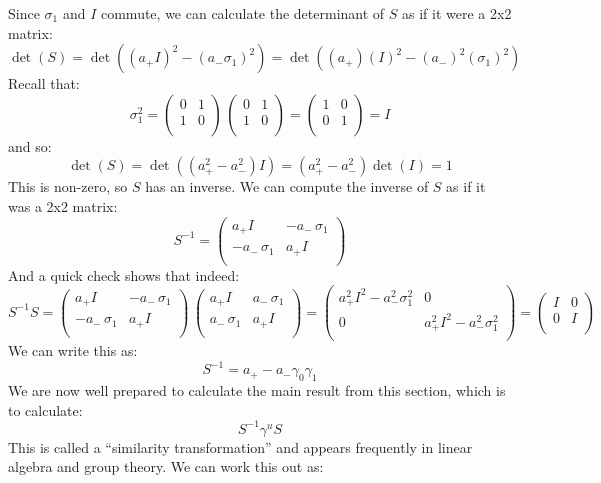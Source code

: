 \documentclass[12pt]{book}
\begin{document}
Since $\sigma_1$ and $I$ commute, we can calculate the determinant of $S$ as if it were a 2x2 matrix:
$$\det(S) = \det((a_+ I)^2 - (a_-\sigma_1)^2) = \det((a_+) (I)^2 - (a_-)^2(\sigma_1)^2)$$
Recall that:
$$\sigma_1^2 = 
\begin{pmatrix} 
0 & 1 \\ 
1 & 0 \\
\end{pmatrix}
\,
\begin{pmatrix} 
0 & 1 \\ 
1 & 0 \\
\end{pmatrix}
=
\begin{pmatrix} 
1 & 0 \\ 
0 & 1 \\
\end{pmatrix}
=
I
$$
and so:
$$\det(S) = \det((a_+^2 - a_-^2) I) = (a_+^2 - a_-^2) \det(I) = 1 $$
This is non-zero, so $S$ has an inverse.  We can compute the inverse of $S$ as if it was a 2x2 matrix:
$$S^{-1} = \begin{pmatrix} 
a_+ I & -a_- \, \sigma_1 \\ 
-a_- \, \sigma_1 & a_+ I \\
\end{pmatrix}
$$
And a quick check shows that indeed:
$$S^{-1}S = 
\begin{pmatrix} 
a_+ I & -a_- \, \sigma_1 \\ 
-a_- \, \sigma_1 & a_+ I \\
\end{pmatrix}
\,
\begin{pmatrix} 
a_+ I & a_- \, \sigma_1 \\ 
a_- \, \sigma_1 & a_+ I \\
\end{pmatrix}
= 
\begin{pmatrix} 
a_+^2I^2-a_-^2\sigma_1^2 & 0 \\ 
0 & a_+^2I^2-a_-^2\sigma_1^2 \\ 
\end{pmatrix}
=
\begin{pmatrix} 
I & 0 \\ 
0 & I \\ 
\end{pmatrix}
$$
We can write this as:
$$S^{-1} = a_+ - a_- \gamma_0 \gamma_1$$
We are now well prepared to calculate the main result from this section, which is to calculate:
$$S^{-1} \gamma^u S$$
This is called a ``similarity transformation'' and appears frequently in linear algebra and group theory.  We can work this out as:
\end{document}
